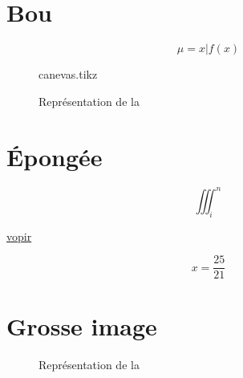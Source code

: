 \chaptertoc{}

\section{Bou}


\lipsum

\begin{equation}
\label{eq:mu}
\mu = {x|f(x)}
\end{equation}

\begin{figure}
  \begin{center}
  {canevas.tikz}
  \end{center}
  \caption{Représentation de la}
  \label{fig:1}
\end{figure}

\section{Épongée}

\begin{equation}
∭_i^n
\end{equation}



\lipsum

\hyperref[eq:mu]{vopir}

\begin{equation}
	\label{eq:1}
	x = \frac{25}{21}
\end{equation}

\section{Grosse image}

\lipsum

\begin{figure}
  \begin{center}
  \end{center}
  \caption{Représentation de la}
  \label{fig:2}
 \end{figure}

\lipsum